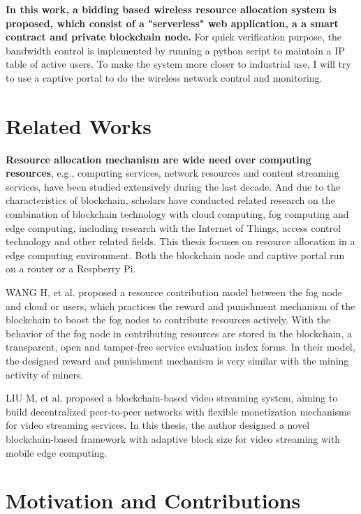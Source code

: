 \textbf{In this work, a bidding based wireless resource allocation system is proposed, which consist of a "serverless" web application, a a smart contract and private blockchain node.} For quick verification purpose, the bandwidth control is implemented by running a python script to maintain a IP table of active users. To make the system more closer to industrial use, I will try to use a captive portal to do the wireless network control and monitoring.

\section{Related Works}

\textbf{Resource allocation mechanism are wide need over computing resources}, e.g., computing services, network resources and content streaming services, have been studied extensively during the last decade. And due to the characteristics of blockchain, scholars have conducted related research on the combination of blockchain technology with cloud computing, fog computing and edge computing, including research with the Internet of Things, access control technology and other related fields. This thesis focuses on resource allocation in a edge computing environment. Both the blockchain node and captive portal run on a router or a Respberry Pi.

WANG H, et al.\cite{wang_blockchain-based_2019} proposed a resource contribution model between the fog node and cloud or users, which practices the reward and punishment mechanism of the blockchain to boost the fog nodes to contribute resources actively. With the behavior of the fog node in contributing resources are stored in the blockchain, a transparent, open and tamper-free service evaluation index forms. In their model, the designed reward and punishment mechanism is very similar with the mining activity of miners.

LIU M, et al.\cite{liu_distributed_2019} proposed a blockchain-based video streaming system, aiming to build decentralized peer-to-peer networks with flexible monetization mechanisms for video streaming services. In this thesis, the author designed a novel blockchain-based framework with adaptive block size for video streaming with mobile edge computing.


\section{Motivation and Contributions}

